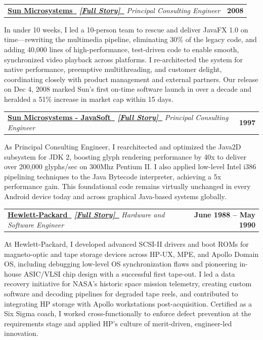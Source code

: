 \documentclass[letterpaper,11pt]{article}
\makeatletter
\newcommand{\faExternalLink}{\faIcon{external-link-alt}}
\renewcommand{\faExternalLink}{\faIcon{external-link-alt}}
\newcommand{\resumeItem}[1]{
    \item\small{
            {#1 \vspace{-2pt}}
    }
}
\newcommand{\resumeSubheading}[4]{
    \vspace{-2pt}\item
    \begin{tabular*}{1.0\textwidth}[t]{l@{\extracolsep{\fill}}r}
    \textbf{#1}  \textit{\small#3} & \textbf{\small #2} \\
    \end{tabular*}\vspace{-7pt}
}
\newcommand{\linkglyph}{{\LinkFont\symbol{"1F517}}}
\makeatother
\begin{document}
\resumeSubheading
{\href{https://www.oracle.com/sun}{Sun Microsystems~\faExternalLink}
\quad\small
\textit{
\href{https://paul-charlton.vercel.app/story/4}{[Full Story]~{\linkglyph}}}
}
{2008}
{Principal Consulting Engineer}
{Santa Clara, CA}
\resumeItem{
In under 10 weeks, I led a 10-person team to rescue and deliver JavaFX 1.0 on time—rewriting the multimedia pipeline, eliminating 30\% of the legacy code, and adding 40,000 lines of high-performance, test-driven code to enable smooth, synchronized video playback across platforms. I re-architected the system for native performance, preemptive multithreading, and customer delight, coordinating closely with product management and external partners. Our release on Dec 4, 2008 marked Sun’s first on-time software launch in over a decade and heralded a 51\% increase in market cap within 15 days.
}
\newpage
\resumeSubheading
{\href{https://www.oracle.com/sun}{Sun Microsystems - JavaSoft~\faExternalLink}
\quad\small
\textit{
\href{https://paul-charlton.vercel.app/story/5}{[Full Story]~{\linkglyph}}}
}
{1997}
{Principal Consulting Engineer}
{Palo Alto, CA}
\resumeItem{
As Principal Consulting Engineer, I rearchitected and optimized the Java2D subsystem for JDK 2, boosting glyph rendering performance by 40x to deliver over 200,000 glyphs/sec on 300Mhz Pentium II. I also applied low-level Intel i386 pipelining techniques to the Java Bytecode interpreter, achieving a 5x performance gain. This foundational code remains virtually unchanged in every Android device today and across graphical Java-based systems globally.
}

\resumeSubheading
{\href{https://www.hp.com}{Hewlett-Packard~\faExternalLink}
\quad\small
\textit{
\href{https://paul-charlton.vercel.app/story/38}{[Full Story]~{\linkglyph}}}
}
{June 1988 -- May 1990}
{Hardware and Software Engineer}
{Greeley, CO}
\resumeItem{
At Hewlett-Packard, I developed advanced SCSI-II drivers and boot ROMs for magneto-optic and tape storage devices across HP-UX, MPE, and Apollo Domain OS, including debugging low-level OS synchronization flaws and pioneering in-house ASIC/VLSI chip design with a successful first tape-out. I led a data recovery initiative for NASA's historic space mission telemetry, creating custom software and decoding pipelines for degraded tape reels, and contributed to integrating HP storage with Apollo workstations post-acquisition. Certified as a Six Sigma coach, I worked cross-functionally to enforce defect prevention at the requirements stage and applied HP's culture of merit-driven, engineer-led innovation.
}
\end{document}

